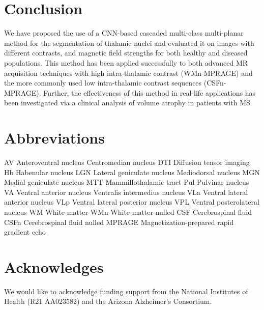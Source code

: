 \section{Conclusion}
We have proposed the use of a CNN-based cascaded multi-class multi-planar method for the segmentation of thalamic nuclei and evaluated it on images with different contrasts, and magnetic field strengths for both healthy and diseased populations. This method has been applied successfully to both advanced MR acquisition techniques with high intra-thalamic contrast (WMn-MPRAGE) and the more commonly used low intra-thalamic contrast sequences (CSFn-MPRAGE). Further, the effectiveness of this method in real-life applications has been investigated via a clinical analysis of volume atrophy in patients with MS\@.

\section{Abbreviations}
AV Anteroventral nucleus
Centromedian nucleus
DTI Diffusion tensor imaging
Hb Habenular nucleus
LGN Lateral geniculate nucleus
Mediodorsal nucleus
MGN Medial geniculate nucleus
MTT Mammillothalamic tract
Pul Pulvinar nucleus
VA Ventral anterior nucleus
Ventralis intermedius nucleus
VLa Ventral lateral anterior nucleus
VLp Ventral lateral posterior nucleus
VPL Ventral posterolateral nucleus
WM White matter
WMn White matter nulled
CSF Cerebrospinal fluid
CSFn Cerebrospinal fluid nulled
MPRAGE Magnetization-prepared rapid gradient echo

\section{Acknowledges}
We would like to acknowledge funding support from the National Institutes of Health (R21 AA023582) and the Arizona Alzheimer's Consortium.

